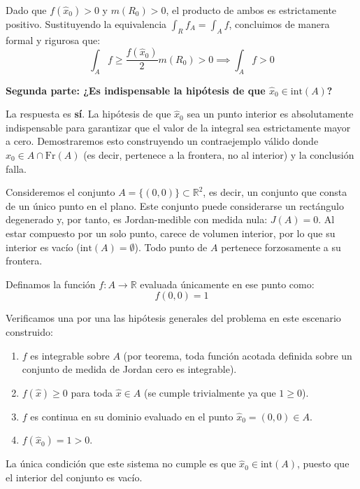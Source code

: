 \documentclass[11pt,letterpaper]{article}
\begin{document}
Dado que $f(\hat{x}_0) > 0$ y $m(R_0) > 0$, el producto de ambos es estrictamente positivo. Sustituyendo la equivalencia $\int_R f_A = \int_A f$, concluimos de manera formal y rigurosa que:
\begin{equation*}
\int_A f \ge \frac{f(\hat{x}_0)}{2} m(R_0) > 0 \implies \int_A f > 0
\end{equation*}

\vspace{0.5cm}
\textbf{Segunda parte: ¿Es indispensable la hipótesis de que $\hat{x}_0 \in \text{int}(A)$?}

La respuesta es \textbf{sí}. La hipótesis de que $\hat{x}_0$ sea un punto interior es absolutamente indispensable para garantizar que el valor de la integral sea estrictamente mayor a cero. Demostraremos esto construyendo un contraejemplo válido donde $\hat{x}_0 \in A \cap \text{Fr}(A)$ (es decir, pertenece a la frontera, no al interior) y la conclusión falla.

Consideremos el conjunto $A = \{(0,0)\} \subset \mathbb{R}^2$, es decir, un conjunto que consta de un único punto en el plano. Este conjunto puede considerarse un rectángulo degenerado y, por tanto, es Jordan-medible con medida nula: $J(A) = 0$. Al estar compuesto por un solo punto, carece de volumen interior, por lo que su interior es vacío ($\text{int}(A) = \emptyset$). Todo punto de $A$ pertenece forzosamente a su frontera.

Definamos la función $f: A \rightarrow \mathbb{R}$ evaluada únicamente en ese punto como:
\begin{equation*}
f(0,0) = 1
\end{equation*}

Verificamos una por una las hipótesis generales del problema en este escenario construido:
\begin{enumerate}
    \item $f$ es integrable sobre $A$ (por teorema, toda función acotada definida sobre un conjunto de medida de Jordan cero es integrable).
    \item $f(\hat{x}) \ge 0$ para toda $\hat{x} \in A$ (se cumple trivialmente ya que $1 \ge 0$).
    \item $f$ es continua en su dominio evaluado en el punto $\hat{x}_0 = (0,0) \in A$.
    \item $f(\hat{x}_0) = 1 > 0$.
\end{enumerate}

La única condición que este sistema no cumple es que $\hat{x}_0 \in \text{int}(A)$, puesto que el interior del conjunto es vacío.
    
\end{document}
